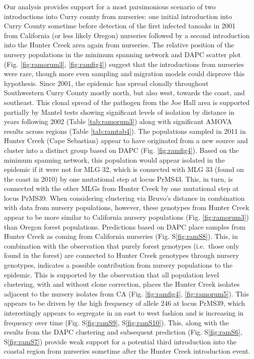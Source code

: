 \documentclass[double,12pt]{beavtex}
\begin{document}
  Our analysis provides support for a most parsimonious scenario of two
  introductions into Curry county from nurseries: one initial introduction
  into Curry County sometime before detection of the first infected
  tanoaks in 2001 from California (or less likely Oregon) nurseries
  followed by a second introduction into the Hunter Creek area again from
  nurseries. The relative position of the nursery populations in the
  minimum spanning network and DAPC scatter plot (Fig. \ref{fig:ramorum3},
  \ref{fig:ramfig4}) suggest that the introductions from nurseries were
  rare, though more even sampling and migration models could disprove this
  hypothesis. Since 2001, the epidemic has spread clonally throughout
  Southwestern Curry County mostly north, but also west, towards the
  coast, and southeast. This clonal spread of the pathogen from the Joe
  Hall area is supported partially by Mantel tests showing significant
  levels of isolation by distance in years following 2002 (Table
  \ref{tab:ramorum3}) along with significant AMOVA results across regions
  (Table \ref{tab:ramtab4}). The populations sampled in 2011 in Hunter
  Creek (Cape Sebastian) appear to have originated from a new source and
  cluster into a distinct group based on DAPC (Fig. \ref{fig:ramfig4}).
  Based on the minimum spanning network, this population would appear
  isolated in the epidemic if it were not for MLG 32, which is connected
  with MLG 33 (found on the coast in 2010) by one mutational step at locus
  PrMS43. This, in turn, is connected with the other MLGs from Hunter
  Creek by one mutational step at locus PrMS39. When considering
  clustering via Bruvo's distance in combination with data from nursery
  populations, however, these genotypes from Hunter Creek appear to be
  more similar to California nursery populations (Fig. \ref{fig:ramorum3})
  than Oregon forest populations. Predictions based on DAPC place samples
  from Hunter Creek as coming from California nurseries (Fig.
  S\ref{fig:ramS8}). This, in combination with the observation that purely
  forest genotypes (i.e.~those only found in the forest) are connected to
  Hunter Creek genotypes through nursery genotypes, indicates a possible
  contribution from nursery populations to the epidemic. This is supported
  by the observation that all population level clustering, with and
  without clone correction, places the Hunter Creek isolates adjacent to
  the nursery isolates from CA (Fig. \ref{fig:ramfig4},
  \ref{fig:ramorum5}). This appears to be driven by the high frequency of
  allele 246 at locus PrMS39, which interestingly appears to segregate in
  an east to west fashion and is increasing in frequency over time (Fig.
  S\ref{fig:ramS9}, S\ref{fig:ramS10}). This, along with the results from
  the DAPC clustering and subsequent prediction (Fig. S\ref{fig:ramS6},
  S\ref{fig:ramS7}) provide weak support for a potential third
  introduction into the coastal region from nurseries sometime after the
  Hunter Creek introduction event.
  
\end{document}
